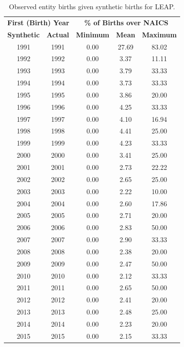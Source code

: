 \begin{table}[H]
\centering\footnotesize
\caption{Observed entity births given synthetic births for LEAP.} \label{tab:Can:ProbabilityPrivate} \medskip
\renewcommand{\arraystretch}{1}
\begin{tabular}{c c| c c c}
\toprule
\multicolumn{2}{c|}{\textbf{First (Birth) Year}} &  \multicolumn{3}{c}{\textbf{\% of Births over NAICS}}\\
\textbf{Synthetic}&\textbf{Actual}&\textbf{Minimum}&\textbf{Mean}&\textbf{Maximum}\\
\midrule
1991&1991&0.00&27.69&83.02\\
1992&1992&0.00&3.37&11.11\\
1993&1993&0.00&3.79&33.33\\
1994&1994&0.00&3.73&33.33\\
1995&1995&0.00&3.86&20.00\\
1996&1996&0.00&4.25&33.33\\
1997&1997&0.00&4.10&16.94\\
1998&1998&0.00&4.41&25.00\\
1999&1999&0.00&4.23&33.33\\
2000&2000&0.00&3.41&25.00\\
2001&2001&0.00&2.73&22.22\\
2002&2002&0.00&2.65&25.00\\
2003&2003&0.00&2.22&10.00\\
2004&2004&0.00&2.60&17.86\\
2005&2005&0.00&2.71&20.00\\
2006&2006&0.00&2.83&50.00\\
2007&2007&0.00&2.90&33.33\\
2008&2008&0.00&2.38&20.00\\
2009&2009&0.00&2.47&50.00\\
2010&2010&0.00&2.12&33.33\\
2011&2011&0.00&2.65&50.00\\
2012&2012&0.00&2.41&20.00\\
2013&2013&0.00&2.48&25.00\\
2014&2014&0.00&2.23&20.00\\
2015&2015&0.00&2.15&33.33\\
 \bottomrule
\end{tabular} 
\\
\justify
\end{table}
 


